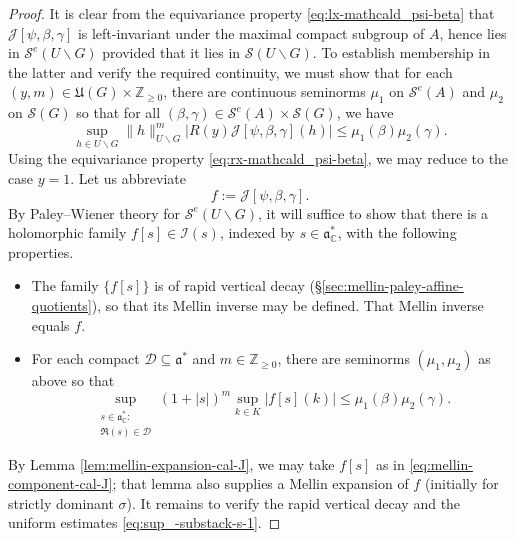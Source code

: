 \begin{proof}
  It is clear from the equivariance property \eqref{eq:lx-mathcald_psi-beta} that $\mathcal{J}[\psi,\beta,\gamma]$ is left-invariant under the maximal compact subgroup of $A$, hence lies in $\mathcal{S}^e(U \backslash G)$ provided that it lies in $\mathcal{S}(U \backslash G)$.  To establish membership in the latter and verify the required continuity, we must show that for each $(y,m) \in \mathfrak{U}(G) \times \mathbb{Z}_{\geq 0}$, there are
  continuous seminorms $\mu_1$ on $\mathcal{S}^e(A)$ and $\mu_2$ on $\mathcal{S}(G)$ so that for all $(\beta,\gamma) \in \mathcal{S}^e(A) \times \mathcal{S}(G)$, we have
  \begin{equation*}
    \sup_{h \in U \backslash G} \|h\|_{U \backslash G}^m \left\lvert R(y) \mathcal{J}[\psi,\beta,\gamma](h) \right\rvert
    \leq
    \mu_1(\beta) \mu_2(\gamma).
  \end{equation*}
  Using the equivariance property \eqref{eq:rx-mathcald_psi-beta}, we may reduce to the case $y=1$.  Let us abbreviate
  \begin{equation*}
    f := \mathcal{J}[\psi,\beta,\gamma].
  \end{equation*}
  By Paley--Wiener theory for $\mathcal{S}^e(U \backslash G)$, it will suffice to show that there is a holomorphic family $f[s] \in \mathcal{I}(s)$, indexed by $s \in \mathfrak{a}_{\mathbb{C}}^*$, with the following properties.
  \begin{itemize}
  \item The family $\{f[s]\}$ is of rapid vertical decay (\S\ref{sec:mellin-paley-affine-quotients}), so that its Mellin inverse may be defined.  That Mellin inverse equals $f$.
  \item For each compact $\mathcal{D} \subseteq \mathfrak{a}^*$ and $m \in \mathbb{Z}_{\geq 0}$, there are seminorms $(\mu_1,\mu_2)$ as above so that
    \begin{equation}\label{eq:sup_-substack-s-1}
      \sup_{
        \substack{
          s \in \mathfrak{a}_{\mathbb{C}}^* :   \\
          \Re(s) \in \mathcal{D}
        }
      }
      (1 + |s|)^{m} \sup_{k \in K} |f[s](k)|  \leq \mu_1(\beta) \mu_2(\gamma).
    \end{equation}
  \end{itemize}
  By Lemma \ref{lem:mellin-expansion-cal-J}, we may take $f[s]$ as in \eqref{eq:mellin-component-cal-J}; that lemma also supplies a Mellin expansion of $f$ (initially for strictly dominant $\sigma$).  It remains to verify the rapid vertical decay and the uniform estimates \eqref{eq:sup_-substack-s-1}.


\end{proof}
